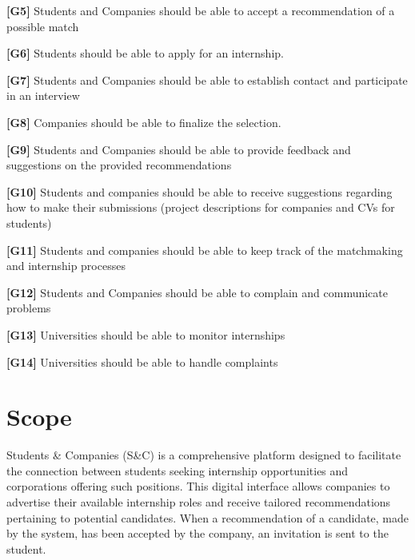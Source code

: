 \textbf{[G5]} Students and Companies should be able to accept a recommendation of a possible match

\textbf{[G6]} Students should be able to apply for an internship.

\textbf{[G7]} Students and Companies should be able to establish contact and participate in an interview

\textbf{[G8]} Companies should be able to finalize the selection.

\textbf{[G9]} Students and Companies should be able to provide feedback and suggestions on the provided recommendations 

\textbf{[G10] }Students and companies should be able to receive suggestions regarding how to make their submissions (project descriptions for companies and CVs for students)

\textbf{[G11]} Students and companies should be able to keep track of the matchmaking and internship processes

\textbf{[G12]} Students and Companies should be able to complain and communicate problems

\textbf{[G13]} Universities should be able to monitor internships

\textbf{[G14]} Universities should be able to handle complaints









\pagebreak
\section{Scope}  
Students \& Companies (S\&C) is a comprehensive platform designed to facilitate the connection between students seeking internship opportunities and corporations offering such positions. This digital interface allows companies to advertise their available internship roles and receive tailored recommendations pertaining to potential candidates. When a recommendation of a candidate, made by the system, has been accepted by the company, an invitation is sent to the student.

